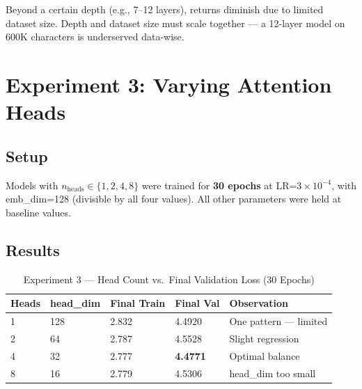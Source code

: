 \documentclass[12pt,a4paper]{article}
\newenvironment{keyinsight}{%
  \begin{tcolorbox}[colback=lightblue!60, colframe=accentblue,
    fonttitle=\bfseries\small\color{navyblue},
    title={Key Insight}, boxrule=0.6pt,
    left=6pt, right=6pt, top=4pt, bottom=4pt]%
}{\end{tcolorbox}}
\begin{document}
\begin{keyinsight}
Beyond a certain depth (e.g., 7–12 layers), returns diminish due to limited dataset size. Depth and dataset size must scale together — a 12-layer model on 600K characters is underserved data-wise.
\end{keyinsight}

\section{Experiment 3: Varying Attention Heads}

\subsection{Setup}

Models with $n_{\text{heads}} \in \{1, 2, 4, 8\}$ were trained for \textbf{30 epochs} at LR=$3\times10^{-4}$, with emb\_dim=128 (divisible by all four values). All other parameters were held at baseline values.

\subsection{Results}

\begin{table}[H]
\centering
\caption{Experiment 3 — Head Count vs.\ Final Validation Loss (30 Epochs)}
\begin{tabular}{C{1.8cm}C{2cm}C{2.8cm}C{2.8cm}C{3cm}}
  \toprule
  \textbf{Heads} & \textbf{head\_dim} & \textbf{Final Train} & \textbf{Final Val} & \textbf{Observation} \\
   & 128 & 2.832 & 4.4920 & One pattern — limited \\
  2 & 64  & 2.787 & 4.5528 & Slight regression \\
  4 & 32  & 2.777 & \textbf{4.4771} & Optimal balance \\
  8 & 16  & 2.779 & 4.5306 & head\_dim too small \\
  \bottomrule
\end{tabular}
\end{table}
\end{document}
